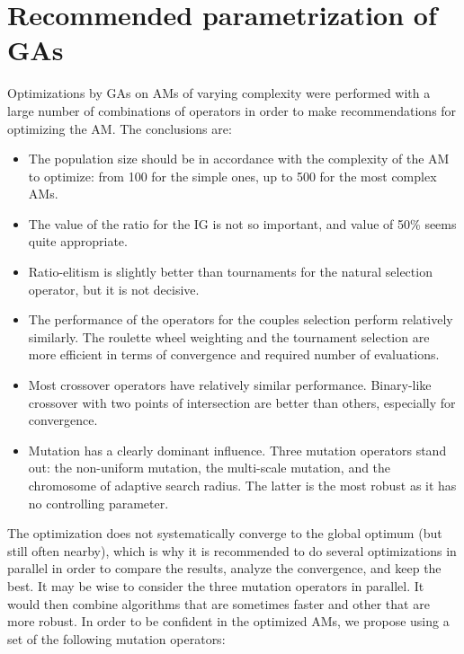 \documentclass[twocol]{ametsoc}
\begin{document}
\section{Recommended parametrization of GAs}
\label{sec:recommendations}

Optimizations by GAs on AMs of varying complexity were performed with a large number of combinations of operators in order to make recommendations for optimizing the AM. The conclusions are:

\begin{itemize}
	\item The population size should be in accordance with the complexity of the AM to optimize: from 100 for the simple ones, up to 500 for the most complex AMs.
	
	\item The value of the ratio for the IG is not so important, and value of 50\% seems quite appropriate.
	
	\item Ratio-elitism is slightly better than tournaments for the natural selection operator, but it is not decisive.
	
	\item The performance of the operators for the couples selection perform relatively similarly. The roulette wheel weighting and the tournament selection are more efficient in terms of convergence and required number of evaluations.
	
	\item Most crossover operators have relatively similar performance. Binary-like crossover with two points of intersection are better than others, especially for convergence.
	
	\item Mutation has a clearly dominant influence. Three mutation operators stand out: the non-uniform mutation, the multi-scale mutation, and the chromosome of adaptive search radius. The latter is the most robust as it has no controlling parameter.
	
\end{itemize}

The optimization does not systematically converge to the global optimum (but still often nearby), which is why it is recommended to do several optimizations in parallel in order to compare the results, analyze the convergence, and keep the best. It may be wise to consider the three mutation operators in parallel. It would then combine algorithms that are sometimes faster and other that are more robust. In order to be confident in the optimized AMs, we propose using a set of the following mutation operators:
\end{document}

